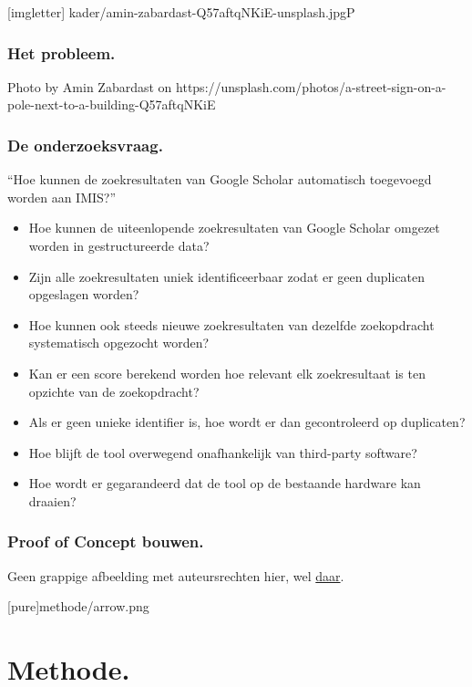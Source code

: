 \documentclass[aspectratio=169]{beamer}
\begin{document}
{
    [imgletter]%
    {kader/amin-zabardast-Q57aftqNKiE-unsplash.jpg}{P}
\begin{frame}
    \frametitle{Het probleem.}
    Photo by Amin Zabardast on https://unsplash.com/photos/a-street-sign-on-a-pole-next-to-a-building-Q57aftqNKiE
    
    
\end{frame}
}

\begin{frame}
    \frametitle{De onderzoeksvraag.}
    ``Hoe kunnen de zoekresultaten van Google Scholar automatisch toegevoegd worden aan IMIS?''
    \begin{itemize}
        \item Hoe kunnen de uiteenlopende zoekresultaten van Google Scholar omgezet worden in gestructureerde data?
        \item Zijn alle zoekresultaten uniek identificeerbaar zodat er geen duplicaten opgeslagen worden?
    \end{itemize}
    \begin{itemize}
        \item Hoe kunnen ook steeds nieuwe zoekresultaten van dezelfde zoekopdracht systematisch opgezocht worden?
        \item Kan er een score berekend worden hoe relevant elk zoekresultaat is ten opzichte van de zoekopdracht?
        \item Als er geen unieke identifier is, hoe wordt er dan gecontroleerd op duplicaten? 
    \end{itemize}
    \begin{itemize}
        \item Hoe blijft de tool overwegend onafhankelijk van third-party software?
        \item Hoe wordt er gegarandeerd dat de tool op de bestaande hardware kan draaien? 
    \end{itemize}
    
    
\end{frame}

\begin{frame}
    \frametitle{Proof of Concept bouwen.}
    Geen grappige afbeelding met auteursrechten hier, wel \href{https://www.slideserve.com/zocha/agile-project-management}{daar}.
    
    
    
\end{frame}

{
    [pure]{methode/arrow.png}
\section{Methode.}
}
\end{document}
